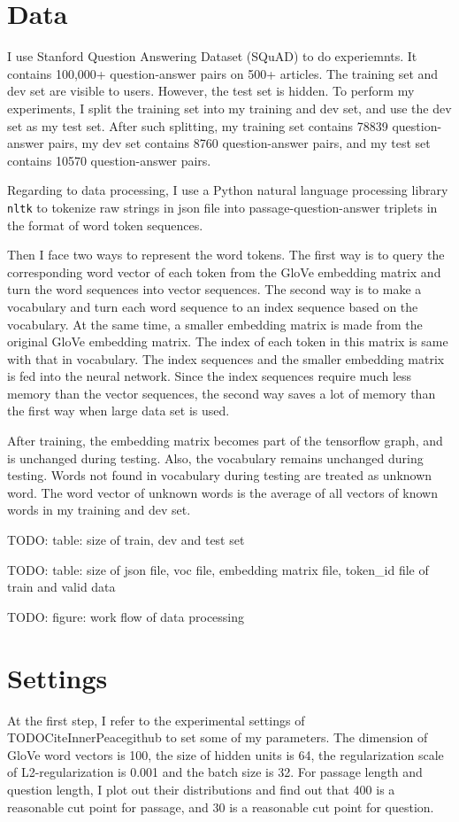 \documentclass[modernstyle,12pt]{sjsuthesis}
\theoremstyle{definition}
\begin{document}
\section{Data}
I use Stanford Question Answering Dataset (SQuAD) to do experiemnts.  It contains 100,000+ question-answer pairs on 500+ articles. The training set and dev set are visible to users. However, the test set is hidden. To perform my experiments, I split the training set into my training and dev set, and use the dev set as my test set. After such splitting, my training set contains 78839 question-answer pairs, my dev set contains 8760 question-answer pairs, and my test set contains 10570 question-answer pairs.

 Regarding to data processing, I use a Python natural language processing library {\tt nltk} to tokenize raw strings in json file into passage-question-answer triplets in the format of word token sequences.

Then I face two ways to represent the word tokens. The first way is to query the corresponding word vector of each token from the GloVe embedding matrix and turn the word sequences into vector sequences.  The second way is to make a vocabulary and turn each word sequence to an index sequence based on the vocabulary. At the same time, a smaller embedding matrix is made from the original GloVe embedding matrix. The index of each token in this matrix is same with that in vocabulary. The index sequences and the smaller embedding matrix is fed into the neural network. Since the index sequences require much less memory than the vector sequences, the second way saves a lot of memory than the first way when large data set is used.

After training, the embedding matrix becomes part of the tensorflow graph, and is unchanged during testing. Also, the vocabulary remains unchanged during testing. Words not found in vocabulary during testing are treated as unknown word. The word vector of unknown words is the average of all vectors of known words in my training and dev set.

TODO: table: size of train, dev and test set

TODO: table: size of json file, voc file, embedding matrix file, token\_id file of train and valid data

TODO: figure: work flow of data processing

\section{Settings}
At the first step, I refer to the experimental settings of TODOCiteInnerPeacegithub to set some of my parameters. The dimension of GloVe word vectors is 100, the size of hidden units is 64, the regularization scale of L2-regularization is 0.001 and the batch size is 32. For passage length and question length, I plot out their distributions and find out that 400 is a reasonable cut point for passage, and 30 is a reasonable cut point for question.
\end{document}
